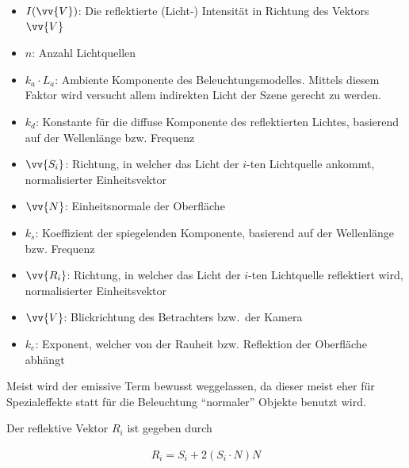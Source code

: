 \begin{itemize}
    \item $I(\vv{V})$:              Die reflektierte (Licht-) Intensität in Richtung des Vektors $\vv{V}$
    \item $n$:                      Anzahl Lichtquellen
    \item $k_{a} \cdot L_{a}$:      Ambiente Komponente des
                                    Beleuchtungsmodelles. Mittels diesem Faktor
                                    wird versucht allem indirekten Licht der
                                    Szene gerecht zu werden.
    \item $k_{d}$:                  Konstante für die diffuse Komponente des
                                    reflektierten Lichtes, basierend auf der
                                    Wellenlänge bzw. Frequenz
    \item $\vv{S_{i}}$:             Richtung, in welcher das Licht der $i$-ten
                                    Lichtquelle ankommt, normalisierter
                                    Einheitsvektor
    \item $\vv{N}$:                 Einheitsnormale der Oberfläche
    \item $k_{s}$:                  Koeffizient der spiegelenden Komponente,
                                    basierend auf der Wellenlänge bzw. Frequenz
    \item $\vv{R_{i}}$:             Richtung, in welcher das Licht der $i$-ten
                                    Lichtquelle reflektiert wird,
                                    normalisierter Einheitsvektor
    \item $\vv{V}$:                 Blickrichtung des Betrachters bzw.\ der
                                    Kamera
    \item $k_{e}$:                  Exponent, welcher von der Rauheit bzw.
                                    Reflektion der Oberfläche abhängt
\end{itemize}

Meist wird der emissive Term bewusst weggelassen, da dieser meist eher für
Spezialeffekte statt für die Beleuchtung ``normaler'' Objekte benutzt wird.

Der reflektive Vektor $R_{i}$ ist gegeben durch

\begin{gather}
    R_{i} = S_{i} + 2(S_{i} \cdot N)N
\end{gather}

